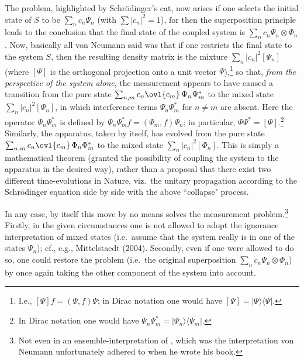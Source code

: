 \documentclass[12pt,titlepage]{article}
\newcommand{\ot}{\otimes}
\begin{document}
The problem, highlighted by Schr\"{o}dinger's cat,  now arises if one selects the initial state of $S$ to be $\sum_n c_n \Psi_n$ (with $\sum |c_n|^2=1$), for then the superposition principle leads to the conclusion that the final state of the coupled system is $\sum_n c_n \Psi_n \ot\Phi_n$. 
 Now, basically all von Neumann said was that if one restricts the final state to the  system $S$, then the resulting density matrix is the mixture $\sum_n |c_n|^2 
 [\Psi_n]$ (where $[\Psi]$ is the orthogonal projection onto a unit vector $\Psi$),\footnote{I.e., $[\Psi]f=(\Psi,f)\Psi$; in Dirac notation one would have $[\Psi]=|\Psi\rangle\langle\Psi|$.} so that, {\it from the perspective of the system alone}, the measurement appears to have caused a transition from the pure state
 $\sum_{n,m} c_n\ovl{c_m}\, \Psi_n\Psi_m^*$
 to the mixed state 
 $\sum_n |c_n|^2 [\Psi_n]$, in which interference terms $\Psi_n\Psi_m^*$ for $n\neq m$
are absent. Here the operator $\Psi_n\Psi_m^*$ is defined by $\Psi_n\Psi_m^*f=(\Psi_m,f)\Psi_n$; in particular, $\Psi\Psi^*=[\Psi]$.\footnote{In
Dirac notation one would have  $\Psi_n\Psi_m^*=|\Psi_n\rangle\langle\Psi_m|$. }
 Similarly, the apparatus, taken by itself, has evolved from  the pure state $\sum_{n,m} c_n\ovl{c_m}\, \Phi_n\Phi^*_m$ to the mixed state 
 $\sum_n |c_n|^2  [\Phi_n]$. This is simply a mathematical theorem (granted the possibility of coupling the system to the apparatus in the desired way), rather than a proposal that there exist two different time-evolutions in Nature, viz.\ the unitary propagation according to the Schr\"{o}dinger equation side by side with the above ``collapse" process.

In any case, by itself this move by no means solves the measurement problem.\footnote{Not even  in an ensemble-interpretation of \qm, which was the interpretation von Neumann unfortunately adhered to when he wrote his book.}  
Firstly, in the given circumstances one is not allowed to adopt the ignorance interpretation of mixed states (i.e.\ assume that the system really is in one of the states $\Psi_n$); cf., e.g., Mittelstaedt (2004). Secondly, even if one were allowed to do so, one could restore the problem (i.e.\ the original superposition $\sum_n c_n \Psi_n\ot \Phi_n$) by once again taking the other component of the system into account. 
\end{document}
